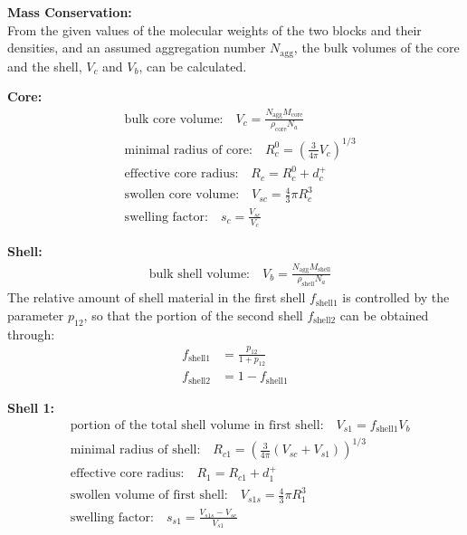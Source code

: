 \noindent \textbf{Mass Conservation:} \\
From the given values of the molecular weights of the two blocks and
their densities, and an assumed aggregation number $N_\text{agg}$,
the bulk volumes of the core and the shell, $V_c$ and $V_b$, can be
calculated.

\noindent \textbf{Core:}
\begin{align}
& \text{bulk core volume:} \quad          V_c = \frac{N_\text{agg} M_\text{core}}{\rho_\text{core}N_a} \\
& \text{minimal radius of core:} \quad    R_c^0 = \left(\frac{3}{4\pi} V_c\right)^{1/3} \\
& \text{effective core radius:} \quad     R_c = R_c^0 + d_c^+ \\
& \text{swollen core volume:} \quad       V_{sc} = \frac{4}{3}\pi R_c^3 \\
& \text{swelling factor:} \quad           s_c = \frac{V_{sc}}{V_c}
\end{align}

\noindent \textbf{Shell:}
\begin{align}
& \text{bulk shell volume:} \quad         V_b = \frac{N_\text{agg}
M_\text{shell}}{\rho_\text{shell}N_a}
\end{align}
The relative amount of shell material in the first shell
$f_\text{shell1}$ is controlled by the parameter $p_{12}$, so that
the portion of the second shell $f_\text{shell2}$ can be obtained
through:
\begin{align}
f_\text{shell1} &= \frac{p_{12}}{1+p_{12}} \\
f_\text{shell2} &= 1-f_\text{shell1}
\end{align}

\noindent \textbf{Shell 1:}
\begin{align}
& \text{portion of the total shell volume in first shell:} \quad  V_{s1} = f_\text{shell1} V_b \\
& \text{minimal radius of shell:} \quad    R_{c1} = \left(\frac{3}{4\pi} (V_{sc}+V_{s1})\right)^{1/3} \\
& \text{effective core radius:} \quad     R_1 = R_{c1} + d_1^+ \\
& \text{swollen volume of first shell:} \quad       V_{s1s} = \frac{4}{3}\pi R_1^3 \\
& \text{swelling factor:} \quad           s_{s1} =
\frac{V_{s1s}-V_{sc}}{V_{s1}}
\end{align}

